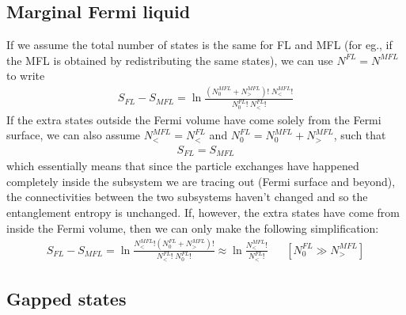 \documentclass[12pt,twoside]{article}
\numberwithin{equation}{section}
\begin{document}
{\subsection{Marginal Fermi liquid}
If we assume the total number of states is the same for FL and MFL (for eg., if the MFL is obtained by redistributing the same states), we can use \(N^{FL} = N^{MFL}\) to write
\begin{equation}\begin{aligned}
	S_{FL} - S_{MFL} = \ln \frac{\left( N^{MFL}_0 + N^{MFL}_> \right) !\;N^{MFL}_<!}{N^{FL}_0!\;N^{FL}_<!}
\end{aligned}\end{equation}
If the extra states outside the Fermi volume have come solely from the Fermi surface, we can also assume \(N_<^{MFL} = N_<^{FL}\) and \(N_0^{FL} = N_0^{MFL} + N_>^{MFL}\), such that
\begin{equation}\begin{aligned}
S_{FL} = S_{MFL}
\end{aligned}\end{equation}
which essentially means that since the particle exchanges have happened completely inside the subsystem we are tracing out (Fermi surface and beyond), the connectivities between the two subsystems haven't changed and so the entanglement entropy is unchanged. 
\pb If, however, the extra states have come from inside the Fermi volume, then we can only make the following simplification:
\begin{equation}\begin{aligned}
	S_{FL} - S_{MFL} = \ln \frac{N^{MFL}_< ! \left( N_0^{FL} + N_>^{MFL} \right)!}{N_<^{FL}!\; N_0^{FL}!} \approx \ln \frac{N^{MFL}_< !}{N_<^{FL}!} && \left[N_0^{FL} \gg N_>^{MFL}\right] 
\end{aligned}\end{equation}

\subsection{Gapped states}
\cite{Anderson}
}


\end{document}
